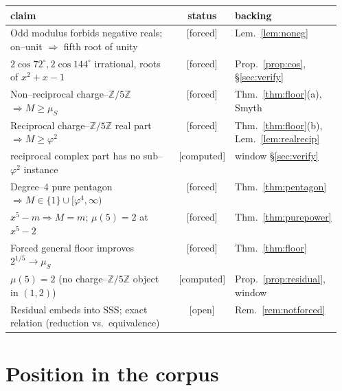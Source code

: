 \documentclass[11pt]{article}
\newcommand{\forced}{\textcolor{cforced}{\textsf{[forced]}}}
\newcommand{\computed}{\textcolor{ccomp}{\textsf{[computed]}}}
\newcommand{\open}{\textcolor{copen}{\textsf{[open]}}}
\newcommand{\Z}{\mathbb{Z}}
\newcommand{\Mah}{M}
\newcommand{\muS}{\mu_S}
\newcommand{\Zfive}{\Z/5\Z}
\theoremstyle{plain}
\theoremstyle{definition}
\theoremstyle{remark}
\begin{document}
\begin{center}\small
\begin{tabular}{p{0.56\linewidth}cl}
\toprule
claim & status & backing\\
\midrule
Odd modulus forbids negative reals; on--unit $\Rightarrow$ fifth root of unity & \forced{} & Lem.~\ref{lem:noneg}\\
$2\cos72^\circ,2\cos144^\circ$ irrational, roots of $x^2+x-1$ & \forced{} & Prop.~\ref{prop:cos}, \S\ref{sec:verify}\\
Non--reciprocal charge--$\Zfive$ $\Rightarrow\Mah\ge\muS$ & \forced{} & Thm.~\ref{thm:floor}(a), Smyth\\
Reciprocal charge--$\Zfive$ real part $\Rightarrow\Mah\ge\varphi^2$ & \forced{} & Thm.~\ref{thm:floor}(b), Lem.~\ref{lem:realrecip}\\
\quad reciprocal complex part has no sub--$\varphi^2$ instance & \computed{} & window \S\ref{sec:verify}\\
Degree--4 pure pentagon $\Rightarrow\Mah\in\{1\}\cup[\varphi^4,\infty)$ & \forced{} & Thm.~\ref{thm:pentagon}\\
$x^5-m\Rightarrow\Mah=m$; $\mu(5)=2$ at $x^5-2$ & \forced{} & Thm.~\ref{thm:purepower}\\
Forced general floor improves $2^{1/5}\to\muS$ & \forced{} & Thm.~\ref{thm:floor}\\
$\mu(5)=2$ (no charge--$\Zfive$ object in $(1,2)$) & \computed{} & Prop.~\ref{prop:residual}, window\\
Residual embeds into SSS; exact relation (reduction vs.\ equivalence) & \open{} & Rem.~\ref{rem:notforced}\\
\bottomrule
\end{tabular}
\end{center}

\section{Position in the corpus}
\end{document}

